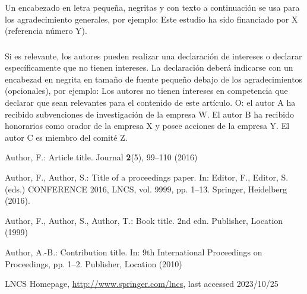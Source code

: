 \documentclass{sistedes}
\begin{document}
\begin{credits}
\subsubsection{\ackname} 
Un encabezado en letra pequeña, negritas y con texto a continuación se usa
para los agradecimiento generales, por ejemplo: Este estudio ha sido financiado
por X (referencia número Y).
\subsubsection{\discintname}
Si es relevante, los autores pueden realizar una declaración de intereses o declarar
específicamente que no tienen intereses. La declaración deberá indicarse con un encabezad
en negrita en tamaño de fuente pequeño debajo de los agradecimientos (opcionales),
por ejemplo: Los autores no tienen intereses en competencia que declarar que sean
relevantes para el contenido de este artículo. O: el autor A ha recibido subvenciones
de investigación de la empresa W. El autor B ha recibido honorarios como orador
de la empresa X y posee acciones de la empresa Y. El autor C es miembro del comité Z.
\end{credits}
%
%
%
% 
% 
%
\begin{thebibliography}{8}
Author, F.: Article title. Journal \textbf{2}(5), 99--110 (2016)

Author, F., Author, S.: Title of a proceedings paper. In: Editor,
F., Editor, S. (eds.) CONFERENCE 2016, LNCS, vol. 9999, pp. 1--13.
Springer, Heidelberg (2016). 

Author, F., Author, S., Author, T.: Book title. 2nd edn. Publisher,
Location (1999)

Author, A.-B.: Contribution title. In: 9th International Proceedings
on Proceedings, pp. 1--2. Publisher, Location (2010)

LNCS Homepage, \url{http://www.springer.com/lncs}, last accessed 2023/10/25
\end{thebibliography}
\end{document}
